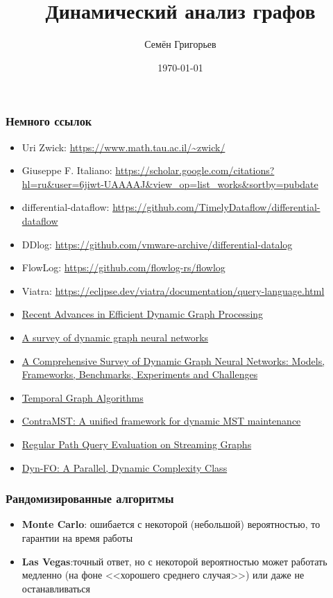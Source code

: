 \documentclass[xcolor=table,aspectratio=169,fleqn]{beamer}
\title[Динамический анализ графов]{Динамический анализ графов}
\institute[СПбГУ]{
Санкт-Петербургский Государственный Университет
}
\author[Семён Григорьев]{Семён Григорьев}
\date{\today}
\begin{document}
{
\begin{frame}[fragile]
  \titlepage
\end{frame}
}

\begin{frame}[fragile]
  \frametitle{Немного ссылок}
  \begin{itemize}    
    \item Uri Zwick: \url{https://www.math.tau.ac.il/~zwick/}
    \item Giuseppe F. Italiano: \url{https://scholar.google.com/citations?hl=ru&user=6jiwt-UAAAAJ&view_op=list_works&sortby=pubdate}
    \item differential-dataflow: \url{https://github.com/TimelyDataflow/differential-dataflow}
    \item DDlog: \url{https://github.com/vmware-archive/differential-datalog}
    \item FlowLog: \url{https://github.com/flowlog-rs/flowlog}
    \item Viatra: \url{https://eclipse.dev/viatra/documentation/query-language.html}
    \pause
    \item \href{https://www.mdpi.com/2076-3417/15/11/6003}{Recent Advances in Efficient Dynamic Graph Processing}
    \item \href{https://arxiv.org/abs/2404.18211}{A survey of dynamic graph neural networks}
    \item \href{https://ieeexplore.ieee.org/abstract/document/11202740}{A Comprehensive Survey of Dynamic Graph Neural Networks: Models, Frameworks, Benchmarks, Experiments and Challenges}
    \item \href{https://bonndoc.ulb.uni-bonn.de/xmlui/handle/20.500.11811/10104}{Temporal Graph Algorithms}
    \item \href{https://www.sciencedirect.com/science/article/pii/S0167739X25003917}{ContraMST: A unified framework for dynamic MST maintenance}
    \item \href{https://dl.acm.org/doi/10.1145/3318464.3389733}{Regular Path Query Evaluation on Streaming Graphs}
    \item \href{https://people.cs.umass.edu/~immerman/pub/dynfo.pdf}{Dyn-FO: A Parallel, Dynamic Complexity Class}
  \end{itemize}
\end{frame}

\begin{frame}[fragile]
  \frametitle{Рандомизированные алгоритмы}
  \begin{itemize}    
    \item \textbf{Monte Carlo}: ошибается с некоторой (небольшой) вероятностью, то гарантии на время работы
    \item \textbf{Las Vegas}:точный ответ, но с некоторой вероятностью может работать медленно (на фоне <<хорошего среднего случая>>) или даже не останавливаться
  \end{itemize}
\end{frame}
\end{document}
